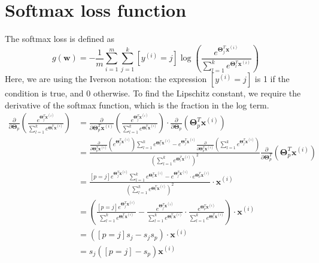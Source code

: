 \documentclass{article}
\begin{document}
\section{Softmax loss function} 
The softmax loss is defined as
\[
    g(\textbf{w}) = -\frac{1}{m} \sum\limits_{i=1}^m \sum\limits_{j=1}^k [y^{(i)}=j] \log \left( \frac{e^{\boldsymbol\Theta_j^T \textbf{x}^{(i)}}}{\sum_{l=1}^k e^{\boldsymbol\Theta_l^T \textbf{x}^{(i)}}} \right)
\]
Here, we are using the Iverson notation: the expression $[y^{(i)}=j]$ is 1 if the condition is true, and 0 otherwise. To find the Lipschitz constant, we require the derivative of the softmax function, which is the fraction in the log term.
\[
    \begin{aligned} \frac{\partial}{\partial \boldsymbol\Theta_p} \left( \frac{e^{\boldsymbol\Theta^T_j \textbf{x}^{(i)}}}{\sum_{l=1}^k e^{\boldsymbol\Theta^T_l \textbf{x}^{(i)}}} \right) &= \frac{\partial}{\partial \boldsymbol\Theta^T_p \textbf{x}^{(i)}} \left( \frac{e^{\boldsymbol\Theta^T_j \textbf{x}^{(i)}}}{\sum_{l=1}^k e^{\boldsymbol\Theta^T_l \textbf{x}^{(i)}}} \right) \cdot \frac{\partial}{\partial \boldsymbol\Theta_p} \left( \boldsymbol\Theta^T_p \textbf{x}^{(i)} \right) \\ &= \frac{\frac{\partial}{\partial \boldsymbol\Theta^T_p \textbf{x}^{(i)}} \left( e^{\boldsymbol\Theta^T_j \textbf{x}^{(i)}} \right) \sum_{l=1}^k e^{\boldsymbol\Theta^T_l \textbf{x}^{(i)}} - e^{\boldsymbol\Theta^T_j \textbf{x}^{(i)}} \frac{\partial}{\partial \boldsymbol\Theta^T_p \textbf{x}^{(i)}} \left( \sum_{l=1}^k e^{\boldsymbol\Theta^T_j \textbf{x}^{(i)}}\right )}{\left( \sum_{l=1}^k e^{\boldsymbol\Theta^T_l \textbf{x}^{(i)}} \right)^2}  \frac{\partial}{\partial \boldsymbol\Theta^T_p} \left( \boldsymbol\Theta_p^T \textbf{x}^{(i)} \right) \\ &= \frac{[p=j] e^{\boldsymbol\Theta^T_j \textbf{x}^{(i)}}\sum_{l=1}^k e^{\boldsymbol\Theta^T_l \textbf{x}^{(i)}} - e^{\boldsymbol\Theta^T_j \textbf{x}^{(i)}} \cdot e^{\boldsymbol\Theta^T_p \textbf{x}^{(i)}} }{\left( \sum_{l=1}^k e^{\boldsymbol\Theta^T_l \textbf{x}^{(i)}} \right)^2} \cdot \textbf{x}^{(i)} \\ &= \left( \frac{[p=j] e^{\boldsymbol\Theta^T_j \textbf{x}^{(i)}}}{\sum_{l=1}^k e^{\boldsymbol\Theta^T_l \textbf{x}^{(i)}}} - \frac{e^{\boldsymbol\Theta^T_j \textbf{x}^{(i)}}}{\sum_{l=1}^k e^{\boldsymbol\Theta^T_l \textbf{x}^{(i)}}} \cdot \frac{e^{\boldsymbol\Theta^T_p \textbf{x}^{(i)}}}{\sum_{l=1}^k e^{\boldsymbol\Theta^T_l \textbf{x}^{(i)}}} \right) \cdot \textbf{x}^{(i)} \\ &= \left([p=j] s_j - s_j s_p \right) \cdot \textbf{x}^{(i)} \\ &= s_j([p=j]-s_p)\textbf{x}^{(i)} \end{aligned}
\]
\end{document}
